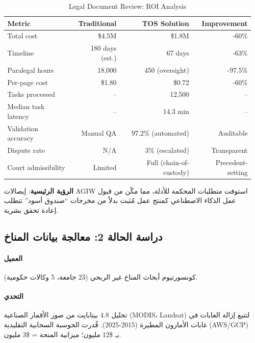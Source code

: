 \documentclass[11pt]{article}
\begin{document}
\begin{table}[H]
\centering
\caption{Legal Document Review: ROI Analysis}
\label{tab:legal-roi}
\begin{tabular}{@{}lrrr@{}}
\toprule
\textbf{Metric} & \textbf{Traditional} & \textbf{TOS Solution} & \textbf{Improvement} \\ \midrule
Total cost & \$4.5M & \$1.8M & -60\% \\
Timeline & 180 days (est.) & 67 days & -63\% \\
Paralegal hours & 18,000 & 450 (oversight) & -97.5\% \\
Per-page cost & \$1.80 & \$0.72 & -60\% \\
Tasks processed & -- & 12,500 & -- \\
Median task latency & -- & 14.3 min & -- \\
Validation accuracy & Manual QA & 97.2\% (automated) & Auditable \\
Dispute rate & N/A & 3\% (escalated) & Transparent \\
Court admissibility & Limited & Full (chain-of-custody) & Precedent-setting \\
\bottomrule
\end{tabular}
\end{table}

\textbf{الرؤية الرئيسية}: إيصالات AGIW استوفت متطلبات المحكمة للأدلة، مما مكّن من قبول عمل الذكاء الاصطناعي كمنتج عمل مُثبت بدلاً من مخرجات ``صندوق أسود'' تتطلب إعادة تحقق بشرية.

\subsection{دراسة الحالة 2: معالجة بيانات المناخ}

\paragraph{العميل} كونسورتيوم أبحاث المناخ غير الربحي (23 جامعة، 5 وكالات حكومية).

\paragraph{التحدي} تحليل 4.8 بيتابايت من صور الأقمار الصناعية (MODIS، Landsat) لتتبع إزالة الغابات في غابات الأمازون المطيرة (2015-2025). قُدرت الحوسبة السحابية التقليدية (AWS/GCP) بـ \$12 مليون؛ ميزانية المنحة = \$3 مليون.
\end{document}
